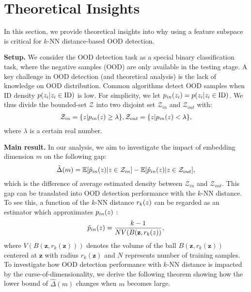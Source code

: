\section{Theoretical Insights}
\label{sec:theory}
In this section, we provide theoretical insights into why using a feature subspace is critical for $k$-NN distance-based OOD detection. 


\noindent \textbf{Setup.}
We consider the OOD detection task as a special binary classification task, where the negative samples (OOD) are only available in the testing stage. A key challenge in OOD detection (and theoretical analysis) is the lack of knowledge on OOD distribution. Common algorithms detect OOD samples when ID density  $p(\*z_i|\*z_i \in  \text{ID})$ is low. For simplicity, we let $p_{in}(\*z_i) = p(\*z_i|\*z_i \in \text{ID})$. We thus divide the bounded-set $\mathcal{Z}$ into two disjoint set $\mathcal{Z}_{in}$ and $\mathcal{Z}_{out}$ with:
    \begin{align}
        \mathcal{Z}_{in} = \{\*z | p_{in}(\*z) \geq \lambda\},  \mathcal{Z}_{out} = \{\*z | p_{in}(\*z) < \lambda\}, 
    \end{align}
where $\lambda$ is a certain real number.

\noindent \textbf{Main result. }   In our analysis, we aim to investigate the impact of embedding dimension $m$ on the following gap:
\begin{align}
    \hat{\Delta}(m) = \mathbb{E}[\hat{p}_{in}(\*z)|{\*z \in \mathcal{Z}_{in}}] - \mathbb{E}[\hat{p}_{in}(\*z)|{\*z \in \mathcal{Z}_{out}}] ,
\end{align}
which is the difference of average estimated density between $\mathcal{Z}_{in}$ and $\mathcal{Z}_{out}$. This gap can be translated into OOD detection performance with the $k$-NN distance. To see this, a function of the $k$-NN distance $r_k(\*z)$ can be regarded as an estimator which approximates $p_{in}(\*z)$ \cite{zhao2022analysis}:
\begin{equation}
  \hat{p}_{in}(\*z) = \frac{k-1}{N V(B(\mathbf{z}, r_k(\*z))},
\end{equation}
where $V(B(\mathbf{z}, r_k(\mathbf{z})))$ denotes the volume of the ball $B(\mathbf{z}, r_k(\mathbf{z}))$ centered at $\mathbf{z}$ with radius $r_k(\mathbf{z})$ and $N$ represents number of training samples. To investigate how OOD detection performance with $k$-NN distance is impacted by the {curse-of-dimensionality}, we derive the following theorem showing how the lower bound of $\hat{\Delta}(m)$ changes when $m$ becomes large. 

